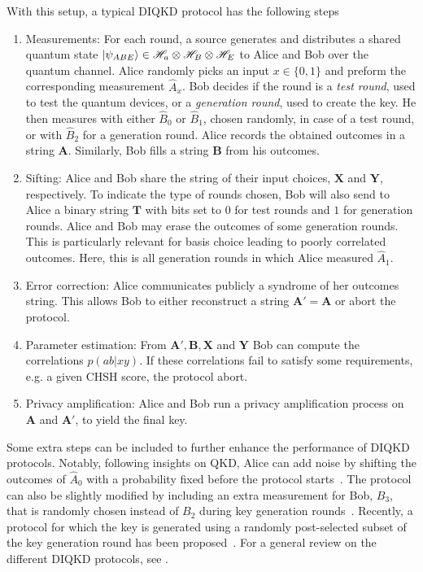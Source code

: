 With this setup, a typical DIQKD protocol has the following steps
\begin{enumerate}
	\item Measurements: For each round, a source generates and distributes a shared quantum state $\ket{\psi_{ABE}} \in \mathscr{H}_a \otimes \mathscr{H}_B \otimes \mathscr{H}_E$ to Alice and Bob over the quantum channel. Alice randomly picks an input $x\in\{0,1\}$ and preform the corresponding measurement $\hat{A}_x$. 
		Bob decides if the round is a \textit{test round}, used to test the quantum devices, or a \textit{generation round}, used to create the key.
		He then measures with either $\hat{B}_0$ or $\hat{B}_1$, chosen randomly, in case of a test round, or with $\hat{B}_2$ for a generation round. 
		Alice records the obtained outcomes in a string $\mathbf{A}$. 
		Similarly, Bob fills a string $\mathbf{B}$ from his outcomes. 
	\item Sifting: 
		Alice and Bob share the string of their input choices, $\mathbf{X}$ and $\mathbf{Y}$, respectively.
		To indicate the type of rounds chosen, Bob will also send to Alice a binary string $\mathbf{T}$ with bits set to $0$ for test rounds and $1$ for generation rounds.  
		Alice and Bob may erase the outcomes of some generation rounds. 
		This is particularly relevant for basis choice leading to poorly correlated outcomes. 
		Here, this is all generation rounds in which Alice measured $\hat{A}_1$. 	
	\item Error correction: 
		Alice communicates publicly a syndrome of her outcomes string. 
		This allows Bob to either reconstruct a string $\mathbf{A'}=\mathbf{A}$ or abort the protocol.
	\item Parameter estimation:
		From $\mathbf{A'},\mathbf{B},\mathbf{X}$ and $\mathbf{Y}$ Bob can compute the correlations $p(ab|xy)$. 
		If these correlations fail to satisfy some requirements, e.g. a given CHSH score, the protocol abort. 
	\item Privacy amplification: 
		Alice and Bob run a privacy amplification process on $\mathbf{A}$ and $\mathbf{A'}$, to yield the final key.
\end{enumerate}

Some extra steps can be included to further enhance the performance of DIQKD protocols.
Notably, following insights on QKD, Alice can add noise by shifting the outcomes of $\hat{A}_0$ with a probability fixed before the protocol starts~\cite{Ho2020}. 
The protocol can also be slightly modified by including an extra measurement for Bob, $B_3$, that is randomly chosen instead of $B_2$ during key generation rounds~\cite{Schwonnek2021}. 
Recently, a protocol for which the key is generated using a randomly post-selected subset of the key generation round has been proposed~\cite{Xu2022}. For a general review on the different DIQKD protocols, see \cite{Primaatmaja2023}.


